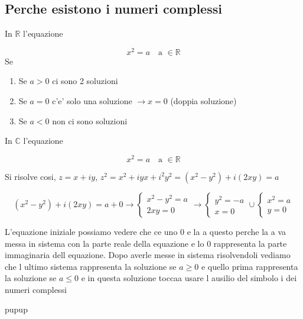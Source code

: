 \documentclass{article}
\begin{document}
          \subsection*{Perche esistono i numeri complessi}
          \begin{flushleft}
            In $\mathbb{R}$ l'equazione
          \end{flushleft}
          \begin{equation*}
            x^2=a \quad \text{a $\in \mathbb{R}$}
          \end{equation*}
          Se
          \begin{enumerate}
            \item Se $a>0$ ci sono 2 soluzioni
            \item Se $a=0$ c'e' solo una soluzione $\to x=0$ (doppia soluzione)
            \item Se $a<0$ non ci sono soluzioni
          \end{enumerate}
          \begin{flushleft}
            In $\mathbb{C}$ l'equazione
          \end{flushleft}
          \begin{equation*}
            x^2=a \quad \text{a $\in \mathbb{R}$}
          \end{equation*}
          \begin{flushleft}
            Si risolve cosi, $z=x+iy$, $z^2=x^2+iyx+i^2y^2=(x^2-y^2)+i(2xy)=a$
          \end{flushleft}
          \begin{equation*}
            (x^2-y^2)+i(2xy)=a+0 \to 
            \begin{cases}
              x^2-y^2=a  \\
              2xy=0
            \end{cases} \to 
            \begin{cases}
              y^2=-a \\
              x=0
            \end{cases} \cup 
            \begin{cases}
              x^2=a \\
              y=0
            \end{cases}
          \end{equation*}
          \begin{flushleft}
            L'equazione iniziale possiamo vedere che ce uno 0 e la a questo perche la a va messa in sistema con la parte reale della equazione e lo 0
            rappresenta la parte immaginaria dell equazione. Dopo averle messe in sistema risolvendoli vediamo che l ultimo sistema rappresenta
            la soluzione se $a\geq 0$ e quello prima rappresenta la soluzione se $a\leq 0$ e in questa soluzione toccaa usare l ausilio del simbolo i dei numeri complessi
          \end{flushleft}
          \begin{flushleft}
            pupup
            
          \end{flushleft}
      
\end{document}
